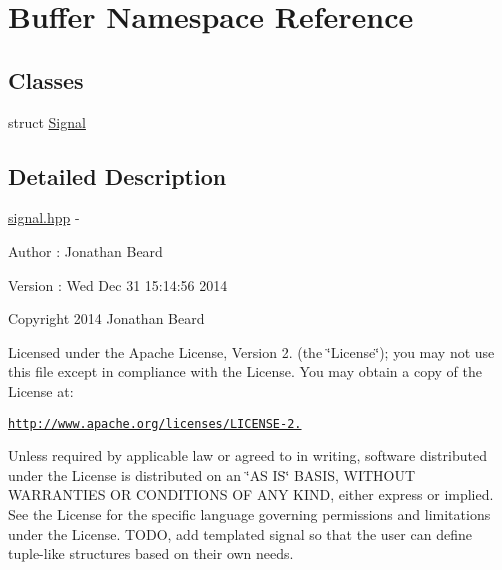 \hypertarget{namespace_buffer}{}\section{Buffer Namespace Reference}
\label{namespace_buffer}
\subsection*{Classes}
\begin{DoxyCompactItemize}
\item 
struct \hyperlink{struct_buffer_1_1_signal}{Signal}
\end{DoxyCompactItemize}


\subsection{Detailed Description}
\hyperlink{signal_8hpp_source}{signal.\+hpp} -\/ \begin{DoxyAuthor}{Author}
\+: Jonathan Beard 
\end{DoxyAuthor}
\begin{DoxyVersion}{Version}
\+: Wed Dec 31 15\+:14\+:56 2014
\end{DoxyVersion}
Copyright 2014 Jonathan Beard

Licensed under the Apache License, Version 2. (the \char`\"{}\+License\char`\"{}); you may not use this file except in compliance with the License. You may obtain a copy of the License at\+:

\href{http://www.apache.org/licenses/LICENSE-2.0}{\tt http\+://www.\+apache.\+org/licenses/\+L\+I\+C\+E\+N\+S\+E-\/2.}

Unless required by applicable law or agreed to in writing, software distributed under the License is distributed on an \char`\"{}\+A\+S I\+S\char`\"{} B\+A\+S\+IS, W\+I\+T\+H\+O\+UT W\+A\+R\+R\+A\+N\+T\+I\+ES OR C\+O\+N\+D\+I\+T\+I\+O\+NS OF A\+NY K\+I\+ND, either express or implied. See the License for the specific language governing permissions and limitations under the License. T\+O\+DO, add templated signal so that the user can define tuple-\/like structures based on their own needs. 